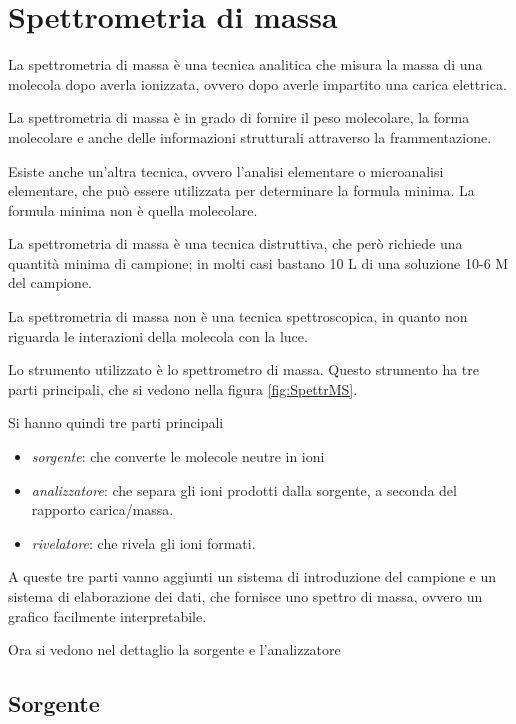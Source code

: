 \chapter{Spettrometria di massa}

La spettrometria di massa è una tecnica analitica che misura la massa di
una molecola dopo averla ionizzata, ovvero dopo averle impartito una
carica elettrica.

La spettrometria di massa è in grado di fornire il peso molecolare, la
forma molecolare e anche delle informazioni strutturali attraverso la
frammentazione.

Esiste anche un'altra tecnica, ovvero l'analisi elementare o
microanalisi elementare, che può essere utilizzata per determinare la
formula minima. La formula minima non è quella molecolare.

La spettrometria di massa è una tecnica distruttiva, che però richiede
una quantità minima di campione; in molti casi bastano 10 \mu L di una
soluzione 10-6 M del campione.

La spettrometria di massa non è una tecnica spettroscopica, in quanto
non riguarda le interazioni della molecola con la luce.

Lo strumento utilizzato è lo spettrometro di massa. Questo strumento ha
tre parti principali, che si vedono nella figura \ref{fig:SpettrMS}.


Si hanno quindi tre parti principali
\begin{itemize}
  \item \textit{sorgente}: che converte le molecole neutre in ioni
  \item \textit{analizzatore}: che separa gli ioni prodotti dalla sorgente, a seconda del rapporto carica/massa.
  \item \textit{rivelatore}: che rivela gli ioni formati.
  \end{itemize}

A queste tre parti vanno aggiunti un sistema di introduzione del
campione e un sistema di elaborazione dei dati, che fornisce uno spettro
di massa, ovvero un grafico facilmente interpretabile.

Ora si vedono nel dettaglio la sorgente e l'analizzatore

\section{Sorgente}

